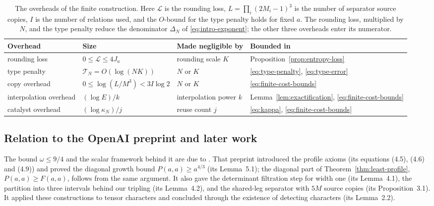 \begin{table}[ht]
\centering
\begin{tabular}{@{}llll@{}}
\toprule
Overhead & Size & Made negligible by & Bounded in\\
\midrule
rounding loss & \(0\le\mathcal L\le4J_a\) & rounding scale \(K\)
 & Proposition~\ref{prop:entropy-loss}\\
type penalty & \(\mathcal T_N=O(\log(NK))\) & \(N\) or \(K\)
 & \eqref{eq:type-penalty}, \eqref{eq:type-error}\\
copy overhead & \(0\le\log(L/M^3)<3I\log2\) & \(N\) or \(K\)
 & \eqref{eq:finite-cost-bounds}\\
interpolation overhead & \((\log E)/k\) & interpolation power \(k\)
 & Lemma~\ref{lem:exactification}, \eqref{eq:finite-cost-bounds}\\
catalyst overhead & \((\log\kappa_N)/j\) & reuse count \(j\)
 & \eqref{eq:kappa}, \eqref{eq:finite-cost-bounds}\\
\bottomrule
\end{tabular}
\caption{The overheads of the finite construction. Here \(\mathcal L\)
is the rounding loss, \(L=\prod_i(2M_i-1)^3\) is the number of separator
source copies, \(I\) is the number of relations used, and the \(O\)-bound for the type penalty holds
for fixed \(a\). The rounding loss, multiplied by \(N\), and the type
penalty reduce the denominator \(\Delta_N\) of \eqref{eq:intro-exponent};
the other three overheads enter its numerator.}
\label{tab:overheads}
\end{table}

\subsection{Relation to the OpenAI preprint and later work}
\label{subsec:intro-oai}

The bound \(\omega\le9/4\) and the scalar framework behind it are due to
\citet{OAI26}. That preprint introduced the profile axioms (its
equations (4.5), (4.6) and (4.9)) and proved the diagonal growth bound
\(P(a,a)\ge a^{4/3}\) (its Lemma~5.1); the diagonal part of
Theorem~\ref{thm:least-profile}, \(P(a,a)\ge F(a,a)\), follows from the
same argument. It also gave the determinant filtration step for width
one (its Lemma~4.1), the partition into three intervals behind our
tripling (its Lemma~4.2), and the shared-leg separator with \(5M\)
source copies (its Proposition~3.1). It applied these constructions to
tensor characters and concluded through the existence of detecting
characters (its Lemma~2.2).

